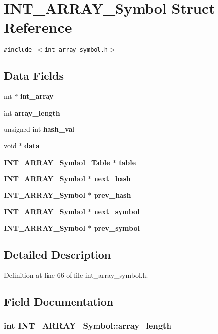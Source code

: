 \section{INT\_\-ARRAY\_\-Symbol Struct Reference}
\label{structINT__ARRAY__Symbol}
{\tt \#include $<$int\_\-array\_\-symbol.h$>$}

\subsection*{Data Fields}
\begin{CompactItemize}
\item 
int $\ast$ \bf{int\_\-array}
\item 
int \bf{array\_\-length}
\item 
unsigned int \bf{hash\_\-val}
\item 
void $\ast$ \bf{data}
\item 
\bf{INT\_\-ARRAY\_\-Symbol\_\-Table} $\ast$ \bf{table}
\item 
\bf{INT\_\-ARRAY\_\-Symbol} $\ast$ \bf{next\_\-hash}
\item 
\bf{INT\_\-ARRAY\_\-Symbol} $\ast$ \bf{prev\_\-hash}
\item 
\bf{INT\_\-ARRAY\_\-Symbol} $\ast$ \bf{next\_\-symbol}
\item 
\bf{INT\_\-ARRAY\_\-Symbol} $\ast$ \bf{prev\_\-symbol}
\end{CompactItemize}


\subsection{Detailed Description}




Definition at line 66 of file int\_\-array\_\-symbol.h.

\subsection{Field Documentation}
\subsubsection{\setlength{\rightskip}{0pt plus 5cm}int \bf{INT\_\-ARRAY\_\-Symbol::array\_\-length}}\label{structINT__ARRAY__Symbol_246327ffe8407dfb24bb00e2502ef007}




